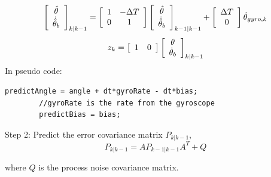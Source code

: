 \documentclass[a4paper]{report}
\begin{document}
		\begin{equation}
		\left[
      		\begin{array}{c}
      		\hat{\theta}\\
		\dot{\hat{\theta}}_{b}
      		\end{array} \right]_{k|k-1}
		=
		\left[
		\begin{array}{c c}
		1 & - \Delta T\\
		0 & 1
		\end{array} \right]
		\left[
		\begin{array}{c}
		\hat{\theta}\\
		\dot{\hat{\theta}}_{b}
		\end{array} \right]_{k-1|k-1}
		+
		\left[
		\begin{array}{c}
		\Delta T\\
		0
		\end{array} \right]
		\dot{\theta}_{gyro, k}\\
		\end{equation}
		\begin{equation*}
		z_{k}=
		\left[
		\begin{array}{c c}
		1 & 0
		\end{array} \right]
		\left[
		\begin{array}{c}
		\theta\\
		\dot{\theta}_{b}
		\end{array} \right]_{k|k-1}
		\end{equation*}
    In pseudo code:
    \begin{lstlisting}[frame=single]
		predictAngle = angle + dt*gyroRate - dt*bias;
		//gyroRate is the rate from the gyroscope
		predictBias = bias;
		\end{lstlisting}

		Step 2: Predict the error covariance matrix $P_{k|k-1}$,
		\begin{equation}
		P_{k|k-1}=AP_{k-1|k-1}A^{T}+Q
		\end{equation}

		where $Q$ is the process noise covariance matrix.
\end{document}
